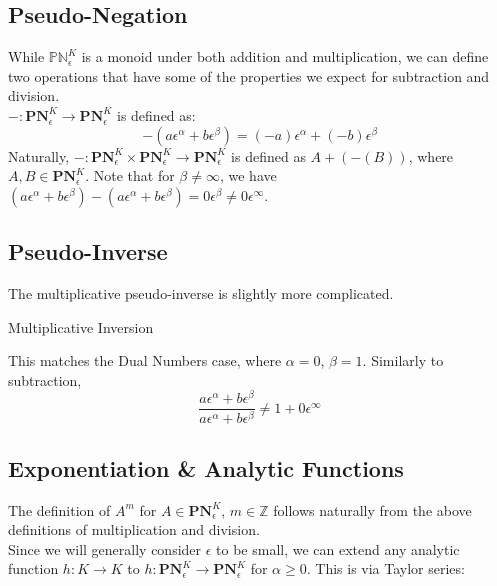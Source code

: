 \documentclass[acmsmall]{acmart}
\begin{document}
\subsection{Pseudo-Negation}
While $\mathbb{PN}^K_\epsilon$ is a monoid under both addition and multiplication, we can define two operations that have some of the properties we expect for subtraction and division. \\
$-:\mathbf{PN}^K_\epsilon \rightarrow \mathbf{PN}^K_\epsilon$ is defined as:
$$-(a\epsilon^\alpha + b\epsilon^\beta) = (-a)\epsilon^\alpha + (-b)\epsilon^\beta$$
Naturally, $-:\mathbf{PN}^K_\epsilon \times \mathbf{PN}^K_\epsilon \rightarrow \mathbf{PN}^K_\epsilon$ is defined as $A + (-(B))$, where $A, B \in \mathbf{PN}^K_\epsilon$.
Note that for $\beta \neq \infty$, we have $(a\epsilon^\alpha + b\epsilon^\beta) - (a\epsilon^\alpha + b\epsilon^\beta) = 0\epsilon^\beta \neq 0\epsilon^\infty$.

\subsection{Pseudo-Inverse}
The multiplicative pseudo-inverse is slightly more complicated.

\begin{algorithm}[H]
	\SetAlgoLined
	
	\caption{Multiplicative Inversion}	
\end{algorithm}

This matches the Dual Numbers case, where $\alpha = 0$, $\beta = 1$.
Similarly to subtraction, 
$$\frac{a\epsilon^\alpha + b\epsilon^\beta}{a\epsilon^\alpha + b\epsilon^\beta} \neq 1 + 0\epsilon^\infty$$

\subsection{Exponentiation \& Analytic Functions}

The definition of $A^m$ for $A \in \mathbf{PN}^K_\epsilon$, $m \in \mathbb{Z}$ follows naturally from the above definitions of multiplication and division. \\
Since we will generally consider $\epsilon$ to be small, we can extend any analytic function $h:K \rightarrow K$ to $h:\mathbf{PN}^K_{\epsilon} \rightarrow \mathbf{PN}^K_{\epsilon}$ for $\alpha \geq 0$. This is via Taylor series:
\end{document}
